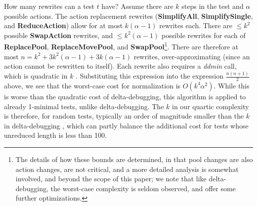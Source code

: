 How many rewrites can a test $t$ have?  Assume there are $k$
steps in the test and $\alpha$ possible actions.  The action
replacement rewrites ({\bf SimplifyAll}, {\bf SimplifySingle}, and
{\bf ReduceAction}) allow for at most $k (\alpha-1)$ rewrites each.  There
are $\leq k^2$ possible {\bf SwapAction} rewrites, and $\leq k^2(\alpha-1)$
possible rewrites for each of {\bf ReplacePool}, {\bf
  ReplaceMovePool}, and {\bf SwapPool}\footnote{The details of how
  these bounds are determined, in that pool changes are also action
  changes, are not critical, and a more detailed analysis is somewhat
  involved, and beyond the scope of this paper; we note that like
  delta-debugging, the worst-case complexity is seldom observed, and
  offer some further optimizations.}.  There are therefore at
most $n=k^2 + 3k^2(\alpha-1) + 3k(\alpha-1)$ rewrites, over-approximating (since
an action cannot be rewritten to itself).  Each rewrite also
requires a \emph{ddmin} call, which is quadratic in $k$ \cite{DD}.
Substituting this expression into the expression $\frac{n(n+1)}{2}$
above, we see that the worst-case cost for normalization is
$O(k^4\alpha^2)$.  While this is
worse than the quadratic cost of delta-debugging, this algorithm is
applied to already 1-minimal tests, unlike delta-debugging. The $k$ in our quartic complexity
is therefore, for random tests, typically an order of magnitude smaller
than the $k$ in delta-debugging \cite{ICSEDiff,icst2014,MinUnit},
which can partly balance the additional cost for tests whose
unreduced length is less than 100.


